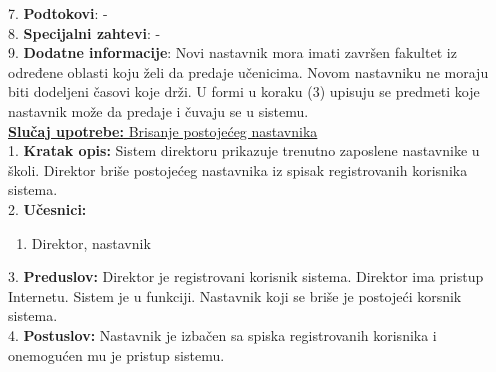\documentclass{article}
\begin{document}
7. \textbf{Podtokovi}: - \\

8. \textbf{Specijalni zahtevi}: - \\

9. \textbf{Dodatne informacije}: Novi nastavnik mora imati završen fakultet iz određene oblasti koju želi da predaje učenicima.
Novom nastavniku ne moraju biti dodeljeni časovi koje drži. U formi u koraku (3) upisuju se predmeti koje nastavnik može da predaje i čuvaju se u sistemu.\\


\underline{\textbf{Slučaj upotrebe:} Brisanje postojećeg nastavnika} \\

1. \textbf{Kratak opis:} Sistem direktoru prikazuje trenutno zaposlene nastavnike u školi. Direktor briše postojećeg nastavnika iz spisak registrovanih korisnika sistema.\\

2. \textbf{Učesnici:}
\begin{enumerate} 
\item Direktor, nastavnik
\end{enumerate} 

3. \textbf{Preduslov:} Direktor je registrovani korisnik sistema. Direktor ima pristup Internetu. Sistem je u funkciji. Nastavnik koji se briše je postojeći korsnik sistema.\\

4. \textbf{Postuslov:}  Nastavnik je izbačen sa spiska registrovanih korisnika i onemogućen mu je pristup sistemu. \\
\end{document}
